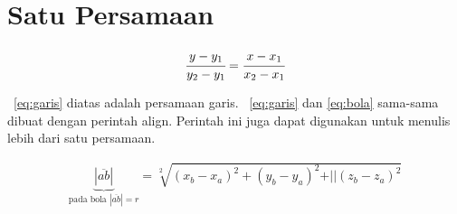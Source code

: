 \iffalse
\section{Satu Persamaan}

\noindent \begin{align}\label{eq:garis}
	\cfrac{y - y_{1}}{y_{2} - y_{1}} = 
	\cfrac{x - x_{1}}{x_{2} - x_{1}}
\end{align}

\equ~\ref{eq:garis} diatas adalah persamaan garis. 
\equ~\ref{eq:garis} dan \ref{eq:bola} sama-sama dibuat dengan perintah \bslash
align. 
Perintah ini juga dapat digunakan untuk menulis lebih dari satu persamaan. 

\noindent \begin{align}\label{eq:bola}
	\underbrace{|\overline{ab}|}_{\text{pada bola $|\overline{ab}| = r$}} 
	= \sqrt[2]{(x_{b} - x_{a})^{2} + (y_{b} - y_{a})^{2} + 
		\vert\vert(z_{b} - z_{a})^{2}}
\end{align}

